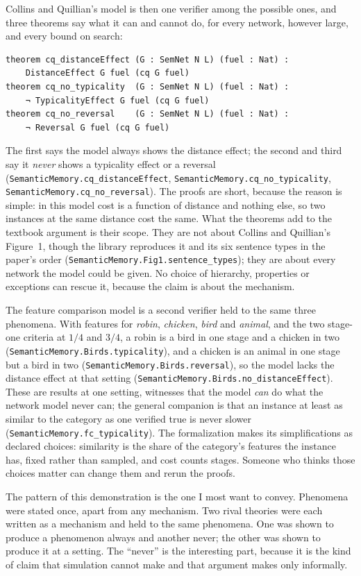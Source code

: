 \documentclass[11pt]{article}
\newcommand{\lean}[1]{\texttt{#1}}
\begin{document}
Collins and Quillian's model is then one verifier among the possible
ones, and three theorems say what it can and cannot do, for every
network, however large, and every bound on search:
\begin{Verbatim}[fontsize=\small]
theorem cq_distanceEffect (G : SemNet N L) (fuel : Nat) :
    DistanceEffect G fuel (cq G fuel)
theorem cq_no_typicality  (G : SemNet N L) (fuel : Nat) :
    ¬ TypicalityEffect G fuel (cq G fuel)
theorem cq_no_reversal    (G : SemNet N L) (fuel : Nat) :
    ¬ Reversal G fuel (cq G fuel)
\end{Verbatim}
The first says the model always shows the distance effect; the second
and third say it \emph{never} shows a typicality effect or a reversal
(\lean{SemanticMemory.cq\_distanceEffect},
\lean{SemanticMemory.cq\_no\_typicality},
\lean{SemanticMemory.cq\_no\_reversal}). The proofs are short, because
the reason is simple: in this model cost is a function of distance and
nothing else, so two instances at the same distance cost the same.
What the theorems add to the textbook argument is their scope. They
are not about Collins and Quillian's Figure~1, though the library
reproduces it and its six sentence types in the paper's order
(\lean{SemanticMemory.Fig1.sentence\_types}); they are about every
network the model could be given. No choice of hierarchy, properties
or exceptions can rescue it, because the claim is about the mechanism.

The feature comparison model is a second verifier held to the same
three phenomena. With features for \emph{robin}, \emph{chicken},
\emph{bird} and \emph{animal}, and the two stage-one criteria at $1/4$
and $3/4$, a robin is a bird in one stage and a chicken in two
(\lean{SemanticMemory.Birds.typicality}), and a chicken is an animal
in one stage but a bird in two (\lean{SemanticMemory.Birds.reversal}),
so the model lacks the distance effect at that setting
(\lean{SemanticMemory.Birds.no\_distanceEffect}). These are results at
one setting, witnesses that the model \emph{can} do what the network
model never can; the general companion is that an instance at least as
similar to the category as one verified true is never slower
(\lean{SemanticMemory.fc\_typicality}). The formalization makes its
simplifications as declared choices: similarity is the share of the
category's features the instance has, fixed rather than sampled, and
cost counts stages. Someone who thinks those choices matter can change
them and rerun the proofs.

The pattern of this demonstration is the one I most want to
convey. Phenomena were stated once, apart from any mechanism. Two
rival theories were each written as a mechanism and held to the same
phenomena. One was shown to produce a phenomenon always and another
never; the other was shown to produce it at a setting. The ``never''
is the interesting part, because it is the kind of claim that
simulation cannot make and that argument makes only informally.
\end{document}
